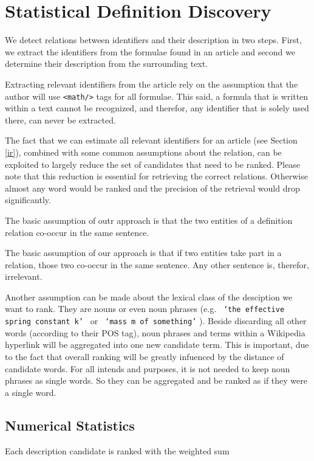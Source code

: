 \documentclass[runningheads]{llncs}
\begin{document}
\section{Statistical Definition Discovery}

We detect relations between identifiers and their description in two steps.
First, we extract the identifiers from the formulae found in an article and
second we determine their description from the surrounding text.

Extracting relevant identifiers from the article rely on the assumption that
the author will use \texttt{<math/>} tags for all formulae. This said, a
formula that is written within a text cannot be recognized, and therefor, any
identifier that is solely used there, can never be extracted.

The fact that we can estimate all relevant identifiers for an article (see
Section \ref{ir}), combined with some common assumptions about the relation,
can be exploited to largely reduce the set of candidates that need to be ranked.
Please note that this reduction is essential for retrieving the correct
relations. Otherwise almost any word would be ranked and the precision of the
retrieval would drop significantly.

The basic assumption of outr approach is that the two entities of a definition
relation co-occur in the same sentence.

The basic assumption of our approach is that if two entities take part in a
relation, those two co-occur in the same sentence.
Any other sentence is, therefor, irrelevant.

Another assumption can be made about the lexical class
of the desciption we want to rank. They are nouns or even noun phrases (e.g.
\texttt{ `the effective spring constant k' } or \texttt{ `mass m of
something'} ). Beside discarding all other words (according to their POS tag),
noun phrases and terms within a Wikipedia hyperlink will be aggregated into
one new candidate term. This is important, due to the fact that overall
ranking will be greatly infuenced by the distance of candidate words. For all
intends and purposes, it is not needed to keep noun phrases as single words.
So they can be aggregated and be ranked as if they were a single word.


\subsection{Numerical Statistics}

Each description candidate is ranked with the weighted sum
\end{document}
